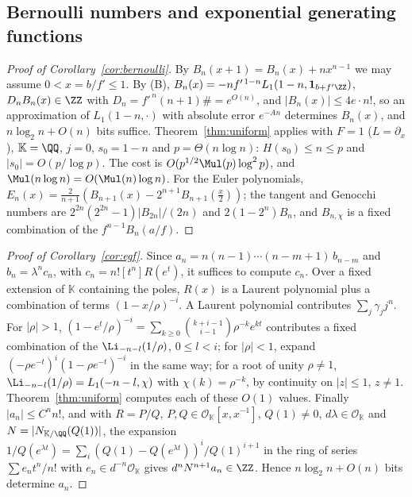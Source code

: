 \begin{small}
\subsection{Bernoulli numbers and exponential generating functions}\label{app:sequences}
\begin{proof}[Proof of Corollary~\ref{cor:bernoulli}]
By $B_n(x+1) = B_n(x) + nx^{n-1}$ we may assume $0 < x = b/f' \le 1$. By (B), $B_n(x) = -nf'^{\,1-n}L_1(1-n,
\mathbf 1_{b+f'\ZZ})$, $D_nB_n(x) \in \ZZ$ with $D_n = f'^{\,n}(n+1)\# = e^{O(n)}$, and $|B_n(x)| \le 4e\cdot n!$, so an
approximation of $L_1(1-n, \cdot)$ with absolute error $e^{-An}$ determines $B_n(x)$, and $n\log_2n + O(n)$ bits suffice.
Theorem~\ref{thm:uniform} applies with $F = 1$ ($L = \partial_x$), $\mathbb K = \QQ$, $j = 0$, $s_0 = 1 - n$ and
$p = \Theta(n\log n)$: $H(s_0) \le n \le p$ and $|s_0| = O(p/\log p)$. The cost is $O(p^{1/2}\Mul(p)\log^2p)$, and
$\Mul(n\log n) = O(\Mul(n)\log n)$. For the Euler polynomials,
$E_n(x) = \frac2{n+1}(B_{n+1}(x) - 2^{n+1}B_{n+1}(\frac x2))$; the tangent and Genocchi numbers are
$2^{2n}(2^{2n}-1)|B_{2n}|/(2n)$ and $2(1-2^n)B_n$, and $B_{n,\chi}$ is a fixed combination of the $f^{n-1}B_n(a/f)$.
\end{proof}

\begin{proof}[Proof of Corollary~\ref{cor:egf}]
Since $a_n = n(n-1)\cdots(n-m+1)\,b_{n-m}$ and $b_n = \lambda^nc_n$, with $c_n = n![t^n]R(e^t)$, it suffices to compute
$c_n$. Over a fixed extension of $\mathbb K$ containing the poles, $R(x)$ is a Laurent polynomial plus a combination of
terms $(1 - x/\rho)^{-i}$. A Laurent polynomial contributes $\sum_j\gamma_jj^n$. For $|\rho| > 1$,
$(1 - e^t/\rho)^{-i} = \sum_{k\ge0}\binom{k+i-1}{i-1}\rho^{-k}e^{kt}$ contributes a fixed combination of the
$\Li_{-n-l}(1/\rho)$, $0 \le l < i$; for $|\rho| < 1$, expand $(-\rho e^{-t})^i(1 - \rho e^{-t})^{-i}$ in the same way;
for a root of unity $\rho \ne 1$, $\Li_{-n-l}(1/\rho) = L_1(-n-l,\chi)$ with $\chi(k) = \rho^{-k}$, by continuity on
$|z| \le 1$, $z \ne 1$. Theorem~\ref{thm:uniform} computes each of these $O(1)$ values. Finally
$|a_n| \le C^nn!$, and with $R = P/Q$, $P, Q \in \mathcal O_{\mathbb K}[x, x^{-1}]$, $Q(1) \ne 0$, $d\lambda \in \mathcal O_{\mathbb K}$
and $N = |N_{\mathbb K/\QQ}(Q(1))|$, the expansion $1/Q(e^{\lambda t}) = \sum_i(Q(1) - Q(e^{\lambda t}))^i/Q(1)^{i+1}$ in
the ring of series $\sum e_nt^n/n!$ with $e_n \in d^{-n}\mathcal O_{\mathbb K}$ gives $d^nN^{n+1}a_n \in \ZZ$. Hence
$n\log_2n + O(n)$ bits determine $a_n$.
\end{proof}


\end{small}
